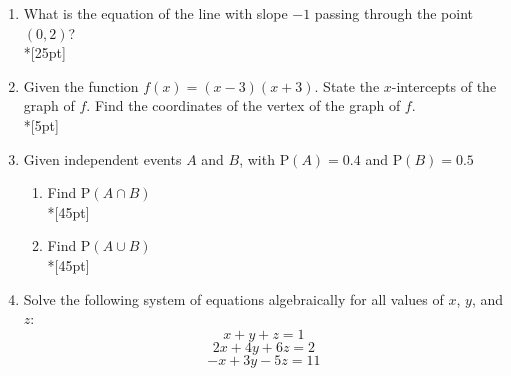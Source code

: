 \documentclass[12pt, oneside]{article}
\begin{document}
\begin{enumerate}
\item What is the equation of the line with slope $-1$ passing through the point $(0, 2)$?\\*[25pt]


\item Given the function $f(x)=(x-3)(x+3)$. State the $x$-intercepts of the graph of $f$. Find the coordinates of the vertex of the graph of $f$.\\*[5pt]


\newpage

\item Given independent events $A$ and $B$, with $\mathrm P(A)=0.4$ and $\mathrm P(B)=0.5$
\begin{enumerate}
    \item Find $\mathrm P(A \cap B)$\\*[45pt]
    \item Find $\mathrm P(A \cup B)$\\*[45pt]
\end{enumerate}


\item Solve the following system of equations algebraically for all values of $x$, $y$, and $z$:
\[x +y+ z=1\]
\[2x+4y+6z=2\]
\[-x+3y-5z=11\]


\end{enumerate}
\end{document}
